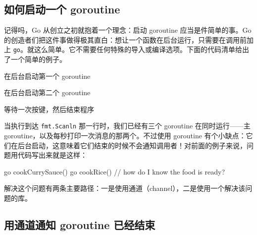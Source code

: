 \subsection{如何启动一个 goroutine}

记得吗，Go 从创立之初就抱着一个理念：启动 goroutine 应当是件简单的事。Go 的创造者们把这件事做得极其直白：想让一个函数在后台运行，只需要在调用前加上 \texttt{go}。就这么简单。它不需要任何特殊的导入或编译选项。下面的代码清单给出了一个简单的例子。


\begin{codeannotations}
\item 在后台启动第一个 goroutine
\item 在后台启动第二个 goroutine
\item 等待一次按键，然后结束程序
\end{codeannotations}

当执行到达 \texttt{fmt.Scanln} 那一行时，我们已经有三个 goroutine 在同时运行——主 goroutine，以及每秒打印一次消息的那两个。不过使用 goroutine 有个小缺点：它们在后台启动，这意味着它们结束的时候不会通知调用者！对前面的例子来说，问题用代码写出来就是这样：

\begin{gocode}[]
go cookCurrySauce()
go cookRice()
// how do I know the food is ready?
\end{gocode}

解决这个问题有两条主要路径：一是使用通道（channel），二是使用一个解决该问题的库。

\subsection{用通道通知 goroutine 已经结束}

